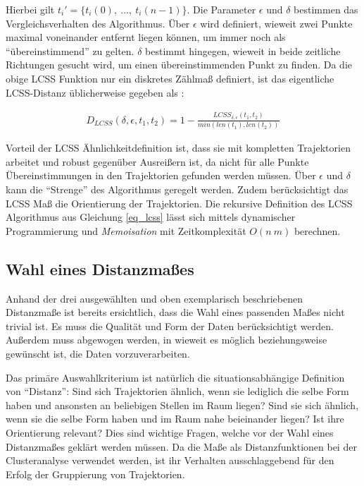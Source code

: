 Hierbei gilt $t_i' = \{ t_i(0),\ ...,\ t_i(n-1)\}$.
Die Parameter $\epsilon$ und $\delta$ bestimmen das
Vergleichsverhalten des Algorithmus. Über $\epsilon$ wird definiert, wieweit zwei Punkte maximal voneinander entfernt liegen
können, um immer noch als ``übereinstimmend'' zu gelten. $\delta$ bestimmt hingegen, wieweit in beide zeitliche Richtungen
gesucht wird, um einen übereinstimmenden Punkt zu finden.
Da die obige LCSS Funktion nur ein diskretes Zählmaß definiert, ist das eigentliche LCSS-Distanz üblicherweise
gegeben als \cite[]{Vlachos2002}:

\begin{ceqn}
\begin{align}
\label{eq_lcss_distance}
    D_{LCSS}(\delta, \epsilon, t_1, t_2) = 1 - \frac{LCSS_{\delta, \epsilon}(t_1, t_2)}{min(len(t_1), len(t_2))}
\end{align}
\end{ceqn}


Vorteil der LCSS Ähnlichkeitdefinition ist, dass sie mit kompletten Trajektorien arbeitet und robust
gegenüber Ausreißern ist, da nicht für alle Punkte Übereinstimmungen in den Trajektorien gefunden werden müssen.
Über $\epsilon$ und $\delta$ kann die ``Strenge'' des Algorithmus geregelt werden.
Zudem berücksichtigt das LCSS Maß die Orientierung der Trajektorien.
Die rekursive Definition des LCSS Algorithmus aus Gleichung \ref{eq_lcss} lässt sich mittels dynamischer Programmierung
und \textit{Memoisation} mit Zeitkomplexität $O(n\ m)$ berechnen.

\subsection{Wahl eines Distanzmaßes}

Anhand der drei ausgewählten und oben exemplarisch beschriebenen Distanzmaße ist bereits ersichtlich,
dass die Wahl eines passenden Maßes nicht trivial ist. Es muss die Qualität und Form der Daten berücksichtigt werden.
Außerdem muss abgewogen werden, in wieweit es möglich beziehungsweise gewünscht ist, die Daten vorzuverarbeiten.

Das primäre Auswahlkriterium ist natürlich die situationsabhängige Definition von ``Distanz'':
Sind sich Trajektorien ähnlich, wenn sie lediglich die selbe Form haben und ansonsten an beliebigen Stellen im Raum liegen?
Sind sie sich ähnlich, wenn sie die selbe Form haben und im Raum nahe beieinander liegen? Ist ihre Orientierung relevant?
Dies sind wichtige Fragen, welche vor der Wahl eines Distanzmaßes geklärt werden müssen.
Da die Maße als Distanzfunktionen bei der Clusteranalyse verwendet werden, ist ihr Verhalten ausschlaggebend
für den Erfolg der Gruppierung von Trajektorien.